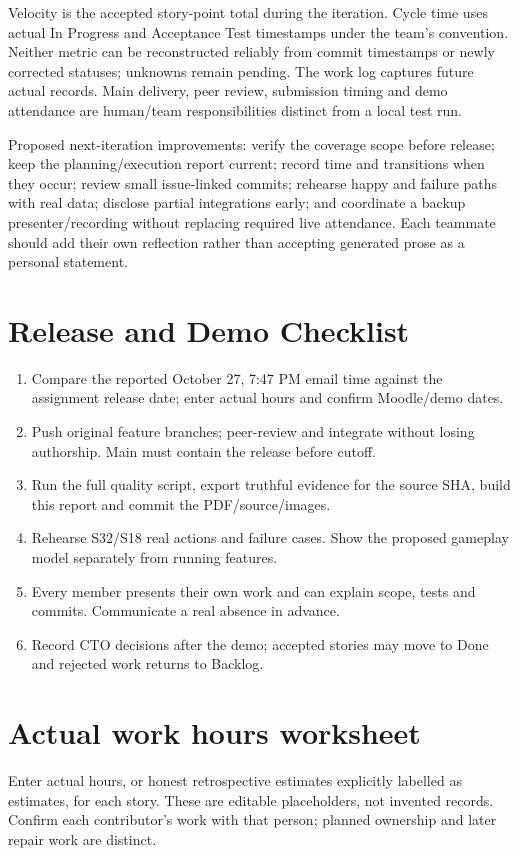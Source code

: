 \documentclass[11pt,a4paper]{article}
\begin{document}
Velocity is the accepted story-point total during the iteration. Cycle time uses actual In Progress and Acceptance Test timestamps under the team's convention. Neither metric can be reconstructed reliably from commit timestamps or newly corrected statuses; unknowns remain pending. The work log captures future actual records. Main delivery, peer review, submission timing and demo attendance are human/team responsibilities distinct from a local test run.

Proposed next-iteration improvements: verify the coverage scope before release; keep the planning/execution report current; record time and transitions when they occur; review small issue-linked commits; rehearse happy and failure paths with real data; disclose partial integrations early; and coordinate a backup presenter/recording without replacing required live attendance. Each teammate should add their own reflection rather than accepting generated prose as a personal statement.

\section{Release and Demo Checklist}
\begin{enumerate}\setlength{\itemsep}{1pt}\setlength{\parsep}{0pt}
\item Compare the reported October 27, 7:47 PM email time against the assignment release date; enter actual hours and confirm Moodle/demo dates.
\item Push original feature branches; peer-review and integrate without losing authorship. Main must contain the release before cutoff.
\item Run the full quality script, export truthful evidence for the source SHA, build this report and commit the PDF/source/images.
\item Rehearse S32/S18 real actions and failure cases. Show the proposed gameplay model separately from running features.
\item Every member presents their own work and can explain scope, tests and commits. Communicate a real absence in advance.
\item Record CTO decisions after the demo; accepted stories may move to Done and rejected work returns to Backlog.
\end{enumerate}


\clearpage
\appendix
\section{Actual work hours worksheet}
Enter actual hours, or honest retrospective estimates explicitly labelled as estimates, for each story. These are editable placeholders, not invented records. Confirm each contributor's work with that person; planned ownership and later repair work are distinct.
\end{document}
